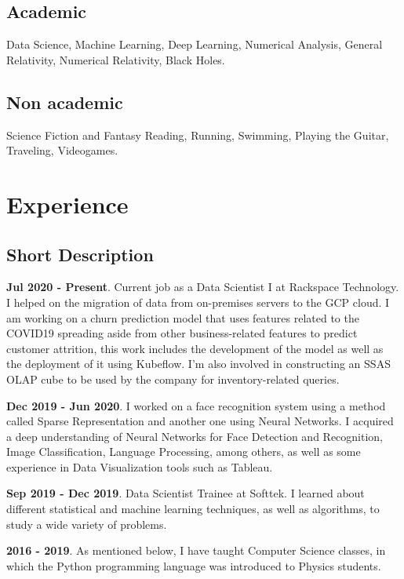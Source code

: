 \documentclass[a4paper,10pt]{article} %
\begin{document}
\subsection*{Academic}
Data Science, Machine Learning, Deep Learning, Numerical Analysis, General Relativity, Numerical Relativity, Black Holes.
\subsection*{Non academic}
Science Fiction and Fantasy Reading, Running, Swimming, Playing the Guitar, Traveling, Videogames. 
\bigskip

\section{Experience}
\bigskip

\subsection{Short Description}
\vspace{0.2cm}
\textbf{Jul 2020 - Present}. Current job as a Data Scientist I at Rackspace Technology. I helped on the migration of data from on-premises servers to the GCP cloud. I am working on a churn prediction model that uses features related to the COVID19 spreading aside from other business-related features to predict customer attrition, this work includes the development of the model as well as the deployment of it using Kubeflow. I'm also involved in constructing an SSAS OLAP cube to be used by the company for inventory-related queries.

\textbf{Dec 2019 - Jun 2020}. I worked on a face recognition system using a method called Sparse Representation and another one using Neural Networks. I acquired a deep understanding of Neural Networks for Face Detection and Recognition, Image Classification, Language Processing, among others, as well as some experience in Data Visualization tools such as Tableau.

\textbf{Sep 2019 - Dec 2019}. Data Scientist Trainee at Softtek. I learned about different statistical and machine learning techniques, as well as algorithms, to study a wide variety of problems.

\textbf{2016 - 2019}. As mentioned below, I have taught Computer Science classes, in which the Python programming language was introduced to Physics students.
\end{document}
